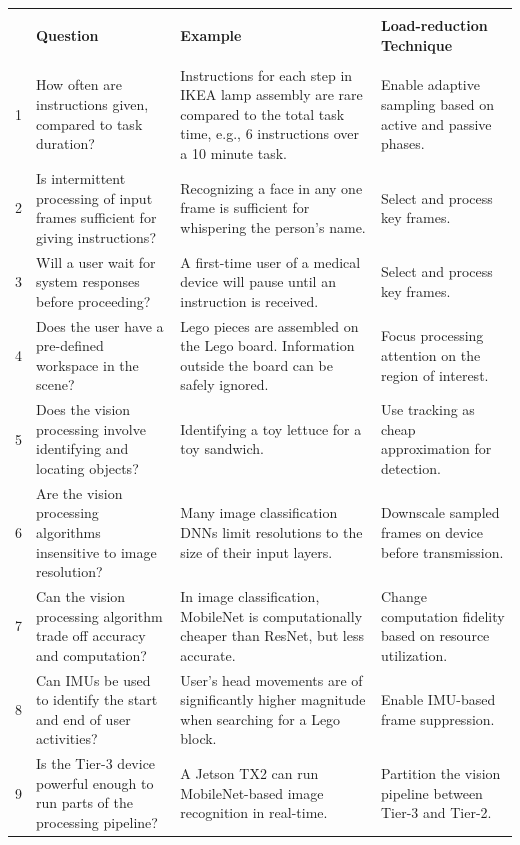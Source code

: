 \begin{table}[h!]
  \begin{center}
    \begin{scriptsize}
      \begin{tabular}{|c|p{4.5cm}|p{5.5cm}|p{4cm}|}
        \hline
        & & & \\
        & \textbf{Question}      & \textbf{Example}   & \textbf{Load-reduction Technique}    \\
        & & & \\
        \hline
        1         & How often are instructions given, compared to task duration?    & Instructions for each step in IKEA lamp assembly are rare compared to the total task time, e.g., 6 instructions over a 10 minute task.    & Enable adaptive sampling based on active and passive phases.    \\
        \hline
        2 & Is intermittent processing of input frames sufficient for giving instructions? & Recognizing a face in any one frame is sufficient for whispering the person’s name. & Select and process key frames.   \\
        \hline
        3 & Will a user wait for system responses before proceeding? & A first-time user of a medical device will pause until an instruction is received. & Select and process key frames. \\
        \hline
        4 & Does the user have a pre-defined workspace in the scene? & Lego pieces are assembled on the Lego board. Information outside the board can be safely ignored. & Focus processing attention on the region of interest.\\
        \hline
        5 & Does the vision processing involve identifying and locating objects? & Identifying a toy lettuce for a toy sandwich. & Use tracking as cheap approximation for detection.\\
        \hline
        6 & Are the vision processing algorithms insensitive to image resolution? & Many image  classification DNNs limit  resolutions to the size of their input layers. & Downscale sampled frames  on  device before transmission.\\
        \hline
        7 & Can the vision processing algorithm trade off accuracy and computation? & In image classification, MobileNet is computationally cheaper than ResNet, but less accurate. & Change computation fidelity based on resource utilization.\\
        \hline
        8 & Can IMUs be used to identify the start and end of user activities? & User’s head movements are of significantly higher magnitude when searching for a Lego block. & Enable  IMU-based  frame suppression.\\
        \hline
        9 & Is the Tier-3 device powerful enough to run parts of the processing pipeline? & A Jetson TX2 can run MobileNet-based image recognition in real-time. & Partition the vision pipeline between Tier-3 and Tier-2.\\


\end{tabular}
\end{scriptsize}
\end{center}
\end{table}
